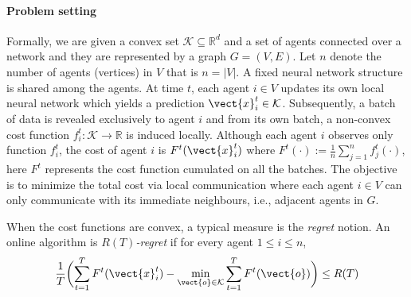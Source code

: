 \paragraph*{\textbf{Problem setting}} Formally, we are given a convex set $\mathcal{K} \subseteq \mathbb{R}^d$ and a set 
of agents connected over a network and they are represented by a graph $G = (V, E)$.  Let $n$ denote the number of agents (vertices) in $V$ that is $ n  = |V|$.  %
A fixed neural network structure is shared among the agents.  
At time $t$, each agent $ i \in V$ updates its own local neural network which yields a prediction $\vect{x}^{t}_{i} \in \mathcal{K}$. 
Subsequently, a batch of data is revealed exclusively to agent $i$ and from its own batch, a non-convex cost function $f^{t}_{i}: \mathcal{K} \rightarrow \mathbb{R}$
is induced locally.
Although each agent $i$ observes only function $f^{t}_{i}$, the cost of agent $i$ is $F^{t}(\vect{x}^{t}_{i})$ where 
$F^{t}(\cdot) := \frac{1}{n} \sum_{j=1}^{n} f^{t}_{j}(\cdot)$, here $F^{t}$ represents the cost function cumulated on all the batches.
The objective is to minimize the total cost via local communication where each agent $i \in V$ can only communicate 
with its immediate neighbours, i.e., adjacent agents in $G$.  

When the cost functions are convex, a typical measure is the \emph{regret} notion. 
An online algorithm is \emph{$R(T)$-regret} if for every agent $1 \leq i \leq n$, 
\begin{align*}
\frac{1}{T} \biggl( \sum_{t = 1}^T F^t(\vect{x}^t_i) - \min_{\vect{o} \in \mathcal{K}} \sum_{t=1}^T F^t(\vect{o}) \biggr) \leq R(T)
\end{align*}
%
%

